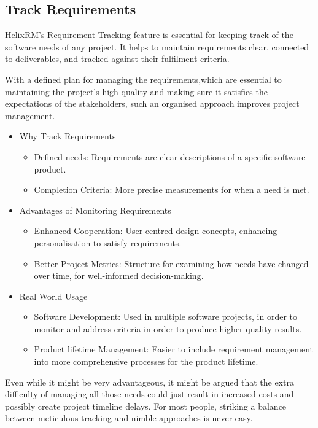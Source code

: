 \subsection{Track Requirements}

HelixRM's Requirement Tracking feature is essential for keeping
track of the software needs of any project.
It helps to maintain requirements clear, connected to
deliverables, and tracked against their fulfilment criteria.

With a defined plan for managing the requirements,which
are essential to maintaining the project's high quality and
making sure it satisfies the expectations of the stakeholders,
such an organised approach improves project management.

\begin{itemize}
    \item Why Track Requirements
    \begin{itemize}
        \item Defined needs: Requirements are clear descriptions of a specific software product\cite{j_e__archer_2003}.
        \item Completion Criteria: More precise measurements for when a need is met\cite{b2}.
    \end{itemize}

    \item Advantages of Monitoring Requirements
    \begin{itemize}
        \item Enhanced Cooperation: User-centred design concepts, enhancing personalisation to satisfy requirements\cite{b3}.
        \item Better Project Metrics: Structure for examining how needs have changed over time, for well-informed decision-making\cite{b2}.
    \end{itemize}

    \item Real World Usage
    \begin{itemize}
        \item Software Development: Used in multiple software projects, in order to monitor and address criteria in order to produce higher-quality results\cite{b4}.
        \item Product lifetime Management: Easier to include requirement management into more comprehensive processes for the product lifetime\cite{b3}.
    \end{itemize}
\end{itemize}

Even while it might be very advantageous, it might be
argued that the extra difficulty of managing all those needs
could just result in increased costs and possibly create project
timeline delays.
For most people, striking a balance between meticulous
tracking and nimble approaches is never easy.

